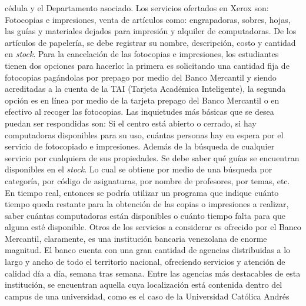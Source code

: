 \message{ !name(InformeFase2.tex)}\documentclass[12pt,a4paper,spanish]{article}
\begin{document}
c\'edula y el Departamento asociado.
\newline
\newline
\indent Los servicios ofertados en Xerox son: Fotocopias e
impresiones, venta de art\'iculos como: engrapadoras, sobres, hojas,
las gu\'ias y materiales dejados para impresi\'on y alquiler de
computadoras. De los art\'iculos de papeler\'ia, se debe registrar su
nombre, descripci\'on, costo y cantidad en \emph{stock}.
\newline
\newline
\indent Para la cancelaci\'on de las fotocopias e
impresiones, los estudiantes tienen dos opciones para hacerlo: la
primera es solicitando una cantidad fija de fotocopias pag\'andolas
por prepago por medio del Banco Mercantil y siendo acreditadas a la
cuenta de la TAI (Tarjeta Acad\'emica Inteligente), la segunda opci\'on
es en l\'inea por medio de la tarjeta prepago del Banco Mercantil o en
efectivo al recoger las fotocopias.
\newline
\newline
\indent Las inquietudes m\'as b\'asicas que se desea puedan ser respondidas
son: Si el centro est\'a abierto o cerrado, si hay computadoras
disponibles para su uso, cu\'antas personas hay en espera por el
servicio de fotocopiado e impresiones. Adem\'as de la b\'usqueda de
cualquier servicio por cualquiera de sus propiedades.
\newline
\newline
\indent Se debe saber qu\'e gu\'ias se encuentran disponibles en el \emph{stock}. 
Lo cual se obtiene por medio de una b\'usqueda por categor\'ia, por c\'odigo de
asignaturas, por nombre de profesores, por temas, etc. En tiempo real, entonces se podr\'ia utilizar
un programa que indique cu\'anto tiempo queda restante para la obtenci\'on de las copias o impresiones 
a realizar, saber cu\'antas computadoras est\'an disponibles o cu\'anto tiempo falta para que alguna
est\'e disponible.
\newline
\newline
\indent Otros de los servicios a considerar es ofrecido por el Banco Mercantil, claramente, es una instituci\'on bancaria venezolana de enorme magnitud. El banco cuenta con una gran cantidad de agencias distribuidas a lo 
largo y ancho de todo el territorio nacional, ofreciendo servicios y atenci\'on de 
calidad d\'ia a d\'ia, semana tras semana. Entre las agencias m\'as destacables de 
esta instituci\'on, se encuentran aquella cuya localizaci\'on est\'a contenida dentro 
del campus de una universidad, como es el caso de la Universidad Cat\'olica Andr\'es 
\end{document}
